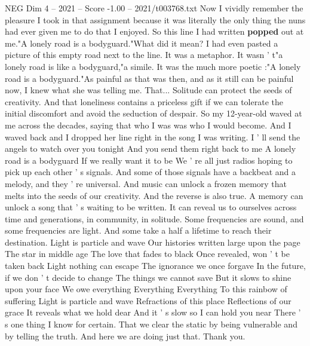 \begin{textsample}{NEG Dim 4 – 2021 – Score -1.00 – 2021/t003768.txt}
Now I vividly remember the pleasure I took in that assignment because it was literally the only thing the nuns had ever given me to do that I enjoyed.
So this line I had written \textbf{popped} out at me."A lonely road is a bodyguard."What did it mean?
I had even pasted a picture of this empty road next to the line.
It was a metaphor.
It wasn ' t"a lonely road is like a bodyguard,"a simile.
It was the much more poetic :"A lonely road is a bodyguard."As painful as that was then, and as it still can be painful now, I knew what she was telling me.
That...
Solitude can protect the seeds of creativity.
And that loneliness contains a priceless gift if we can tolerate the initial discomfort and avoid the seduction of despair.
So my 12-year-old waved at me across the decades, saying that who I was was who I would become.
And I waved back and I dropped her line right in the song I was writing.
I ' ll send the angels to watch over you tonight And you send them right back to me A lonely road is a bodyguard If we really want it to be We ' re all just radios hoping to pick up each other ' s signals.
And some of those signals have a backbeat and a melody, and they ' re universal.
And music can unlock a frozen memory that melts into the seeds of our creativity.
And the reverse is also true.
A memory can unlock a song that ' s waiting to be written.
It can reveal us to ourselves across time and generations, in community, in solitude.
Some frequencies are sound, and some frequencies are light.
And some take a half a lifetime to reach their destination.
Light is particle and wave Our histories written large upon the page The star in middle age The love that fades to black Once revealed, won ' t be taken back Light nothing can escape The ignorance we once forgave In the future, if we don ' t decide to change The things we cannot save But it slows to shine upon your face We owe everything Everything Everything To this rainbow of suffering Light is particle and wave Refractions of this place Reflections of our grace It reveals what we hold dear And it ' s slow so I can hold you near There ' s one thing I know for certain.
That we clear the static by being vulnerable and by telling the truth.
And here we are doing just that.
Thank you.

\end{textsample}

